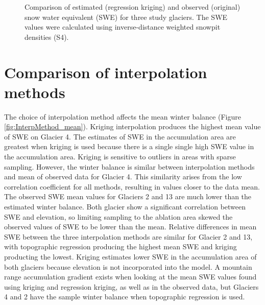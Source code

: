 \documentclass{sfuthesis}
\begin{document}
\begin{figure}[H]
	\caption{Comparison of estimated (regression kriging) and observed (original) snow water equivalent (SWE) for three study glaciers. The SWE values were calculated using inverse-distance weighted snowpit densities (S4).}
	\label{fig:R2regressionkrig}
\end{figure}


\section{Comparison of interpolation methods}

The choice of interpolation method affects the mean winter balance (Figure \ref{fig:InterpMethod_mean}). Kriging interpolation produces the highest mean value of SWE on Glacier 4. The estimates of SWE in the accumulation area are greatest when kriging is used because there is a single single high SWE value in the accumulation area. Kriging is sensitive to outliers in areas with sparse sampling. However, the winter balance is similar between interpolation methods and mean of observed data for Glacier 4. This similarity arises from the low correlation coefficient for all methods, resulting in values closer to the data mean. The observed SWE mean values for Glaciers 2 and 13 are much lower than the estimated winter balance. Both glacier show a significant correlation between SWE and elevation, so limiting sampling to the ablation area skewed the observed values of SWE to be lower than the mean. Relative differences in mean SWE between the three interpolation methods are similar for Glacier 2 and 13, with topographic regression producing the highest mean SWE and kriging producting the lowest. Kriging estimates lower SWE in the accumulation area of both glaciers because elevation is not incorporated into the model. A mountain range accumulation gradient exists when looking at the mean SWE values found using kriging and regression kriging, as well as in the observed data, but Glaciers 4 and 2 have the sample winter balance when topographic regression is used.
\end{document}
